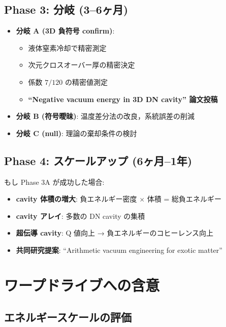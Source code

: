 \documentclass[11pt,a4paper]{article}
\begin{document}
\subsection{Phase 3: 分岐 (3--6ヶ月)}

\begin{itemize}
\item \textbf{分岐 A (3D 負符号 confirm)}:
  \begin{itemize}
  \item 液体窒素冷却で精密測定
  \item 次元クロスオーバー厚の精密決定
  \item 係数 $7/120$ の精密値測定
  \item \textbf{``Negative vacuum energy in 3D DN cavity'' 論文投稿}
  \end{itemize}
\item \textbf{分岐 B (符号曖昧)}: 温度差分法の改良，系統誤差の削減
\item \textbf{分岐 C (null)}: 理論の棄却条件の検討
\end{itemize}

\subsection{Phase 4: スケールアップ (6ヶ月--1年)}

もし Phase 3A が成功した場合:
\begin{itemize}
\item \textbf{cavity 体積の増大}: 負エネルギー密度 $\times$ 体積 = 総負エネルギー
\item \textbf{cavity アレイ}: 多数の DN cavity の集積
\item \textbf{超伝導 cavity}: Q 値向上 → 負エネルギーのコヒーレンス向上
\item \textbf{共同研究提案}: ``Arithmetic vacuum engineering for exotic matter''
\end{itemize}


\section{ワープドライブへの含意}

\subsection{エネルギースケールの評価}
\end{document}
